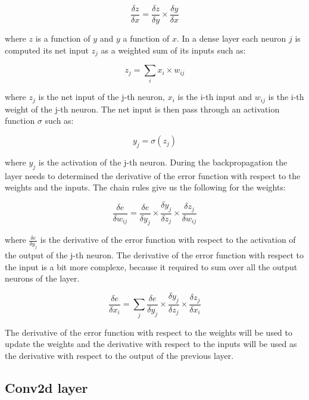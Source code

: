 \documentclass[11pt]{report}
\begin{document}
\begin{equation}
\frac{\delta z}{\delta x} = \frac{\delta z}{\delta y} \times \frac{\delta y}{\delta x}
\end{equation}

\noindent where $z$ is a function of $y$ and $y$ a function of $x$. In a dense layer each neuron $j$ is computed its net input $z_j$ as a weighted sum of its inputs such as:

\begin{equation}
z_j = \sum_{i}{x_i \times w_{ij}}
\end{equation}

\noindent where $z_j$ is the net input of the j-th neuron, $x_i$ is the i-th input and $w_{ij}$ is the i-th weight of the j-th neuron. The net input is then pass through an activation function $\sigma$ such as:

\begin{equation}
y_j = \sigma(z_j)
\end{equation}

\noindent where $y_j$ is the activation of the j-th neuron. During the backpropagation the layer needs to determined the derivative of the error function with respect to the weights and the inputs. The chain rules give us the following for the weights:

\begin{equation}
\frac{\delta e}{\delta w_{ij}} = \frac{\delta e}{\delta y_j} \times \frac{\delta y_j}{\delta z_j} \times \frac{\delta z_j}{\delta w_{ij}}
\end{equation}

\noindent where $\frac{\delta e}{\delta y_j}$ is the derivative of the error function with respect to the activation of the output of the j-th neuron. The derivative of the error function with respect to the input is a bit more complexe, because it required to sum over all the output neurons of the layer.

\begin{equation}
\frac{\delta e}{\delta x_{i}} = \sum_{j} \frac{\delta e}{\delta y_j} \times \frac{\delta y_j}{\delta z_j} \times \frac{\delta z_j}{\delta x_i}
\end{equation}

\noindent The derivative of the error function with respect to the weights will be used to update the weights and the derivative with respect to the inputs will be used as the derivative with respect to the output of the previous layer.

\subsection{Conv2d layer} \label{sec:conv2d}
\end{document}

